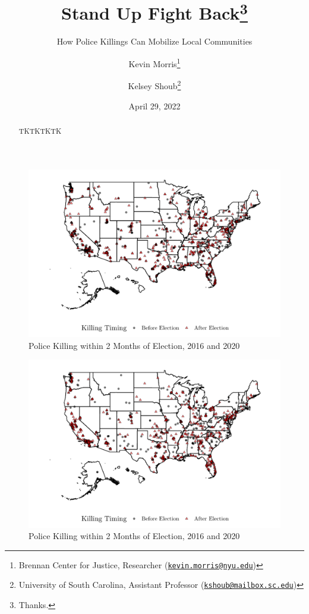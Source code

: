 \documentclass[
  12pt,
]{article}
\title{Stand Up Fight Back\thanks{Thanks.}}
\subtitle{How Police Killings Can Mobilize Local Communities}
\author{Kevin Morris\footnote{Brennan Center for Justice, Researcher (\href{mailto:kevin.morris@nyu.edu}{\nolinkurl{kevin.morris@nyu.edu}})} \and Kelsey Shoub\footnote{University of South Carolina, Assistant Professor (\href{mailto:kshoub@mailbox.sc.edu}{\nolinkurl{kshoub@mailbox.sc.edu}})}}
\date{April 29, 2022}
\begin{document}
\maketitle
\begin{abstract}
TKTKTKTK
\end{abstract}

\pagebreak
\doublespacing


\begin{figure}[h]

{\centering \includegraphics{shoot_to_files/figure-latex/map-1} 

}

\caption{\label{fig:map}Police Killing within 2 Months of Election, 2016 and 2020}\label{fig:map}
\end{figure}

\begin{figure}[h]

{\centering \includegraphics{shoot_to_files/figure-latex/map-16-1} 

}

\caption{\label{fig:map}Police Killing within 2 Months of Election, 2016 and 2020}\label{fig:map-16}
\end{figure}
\end{document}
